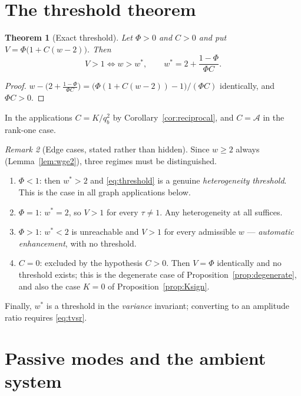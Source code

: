 \documentclass[11pt]{article}
\theoremstyle{plain}
\newtheorem{theorem}{Theorem}
\theoremstyle{definition}
\theoremstyle{remark}
\newtheorem{remark}[theorem]{Remark}
\newcommand{\Aco}{\mathcal{A}}
\begin{document}
\section{The threshold theorem}\label{sec:threshold}

\begin{theorem}[Exact threshold]\label{thm:threshold}
Let $\Phi>0$ and $C>0$ and put $V=\Phi\bigl(1+C(w-2)\bigr)$. Then
\begin{equation}
  V>1 \iff w>w^{*}, \qquad w^{*}=2+\frac{1-\Phi}{\Phi C}. \label{eq:threshold}
\end{equation}
\end{theorem}

\begin{proof}
$w-\bigl(2+\tfrac{1-\Phi}{\Phi C}\bigr)=\bigl(\Phi(1+C(w-2))-1\bigr)/(\Phi C)$ identically, and
$\Phi C>0$.
\end{proof}

In the applications $C=K/q_b^2$ by Corollary~\ref{cor:reciprocal}, and $C=\Aco$ in the rank-one
case.

\begin{remark}[Edge cases, stated rather than hidden]\label{rem:edge}
Since $w\ge2$ always (Lemma~\ref{lem:wge2}), three regimes must be distinguished.
\begin{enumerate}\itemsep2pt
\item $\Phi<1$: then $w^{*}>2$ and \eqref{eq:threshold} is a genuine \emph{heterogeneity
  threshold}. This is the case in all graph applications below.
\item $\Phi=1$: $w^{*}=2$, so $V>1$ for every $\tau\neq1$. Any heterogeneity at all suffices.
\item $\Phi>1$: $w^{*}<2$ is unreachable and $V>1$ for every admissible $w$ ---
  \emph{automatic enhancement}, with no threshold.
\item $C=0$: excluded by the hypothesis $C>0$. Then $V=\Phi$ identically and no threshold
  exists; this is the degenerate case of Proposition~\ref{prop:degenerate}, and also the case
  $K=0$ of Proposition~\ref{prop:Ksign}.
\end{enumerate}
Finally, $w^{*}$ is a threshold in the \emph{variance} invariant; converting to an amplitude
ratio requires \eqref{eq:tvsr}.
\end{remark}

\section{Passive modes and the ambient system}\label{sec:passive}
\end{document}
